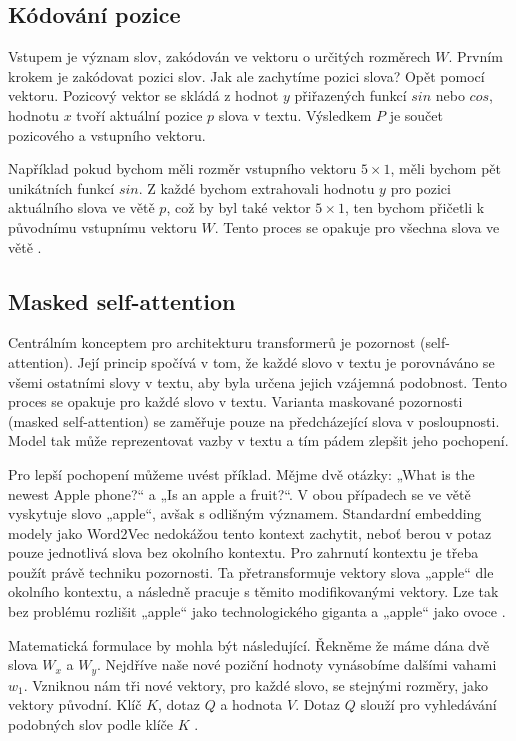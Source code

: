 \documentclass[FM,DP]{tulthesis}
\begin{document}
		\subsection{Kódování pozice}
		Vstupem je význam slov, zakódován ve vektoru o určitých rozměrech $W$. Prvním krokem je zakódovat pozici slov. Jak ale zachytíme pozici slova? Opět pomocí vektoru. Pozicový vektor se skládá z hodnot $y$ přiřazených funkcí $sin$ nebo $cos$, hodnotu $x$ tvoří aktuální pozice $p$ slova v textu. Výsledkem $P$ je součet pozicového a vstupního vektoru. 
		
		Například pokud bychom měli rozměr vstupního vektoru $5 \times 1$, měli bychom pět unikátních funkcí $sin$. Z každé bychom extrahovali hodnotu $y$ pro pozici aktuálního slova ve větě $p$, což by byl také vektor $5 \times 1$, ten bychom přičetli k původnímu vstupnímu vektoru $W$. Tento proces se opakuje pro všechna slova ve větě \cite{rothman2021transformers}. 
		
		\subsection{Masked self-attention}
		Centrálním konceptem pro architekturu transformerů je pozornost (self-attention). Její princip spočívá v tom, že každé slovo v textu je porovnáváno se všemi ostatními slovy v textu, aby byla určena jejich vzájemná podobnost. Tento proces se opakuje pro každé slovo v textu. Varianta maskované pozornosti (masked self-attention) se zaměřuje pouze na předcházející slova v posloupnosti. Model tak může reprezentovat vazby v textu a tím pádem zlepšit jeho pochopení.
		
		Pro lepší pochopení můžeme uvést příklad. Mějme dvě otázky: „What is the newest Apple phone?“ a „Is an apple a fruit?“.  V obou případech se ve větě vyskytuje slovo „apple“, avšak s odlišným významem. Standardní embedding modely jako Word2Vec nedokážou tento kontext zachytit, neboť berou v potaz pouze jednotlivá slova bez okolního kontextu. Pro zahrnutí kontextu je třeba použít právě techniku pozornosti. Ta přetransformuje vektory slova „apple“ dle okolního kontextu, a následně pracuje s těmito modifikovanými vektory. Lze tak bez problému rozlišit „apple“ jako technologického giganta a „apple“ jako ovoce \cite{vaswani2023attention}.
		
		Matematická formulace by mohla být následující. Řekněme že máme dána dvě slova $W_x$ a $W_y$. Nejdříve naše nové poziční hodnoty vynásobíme dalšími vahami $w_1$. Vzniknou nám tři nové vektory, pro každé slovo, se stejnými rozměry, jako vektory původní. Klíč $K$, dotaz $Q$ a hodnota $V$. Dotaz $Q$ slouží pro vyhledávání podobných slov podle klíče $K$ \cite{vaswani2023attention} \cite{rothman2021transformers}. 
		
\end{document}

